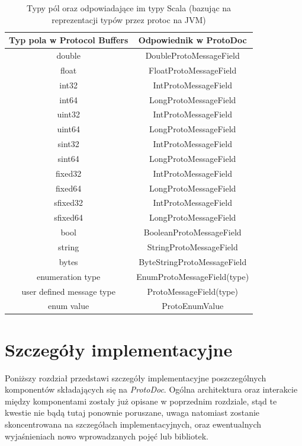 \documentclass[pdflatex,11pt]{aghdpl}
\begin{document}
\begin{table}
 \begin{center}
\begin{tabular}[c]{|c|c|}
\hline 
Typ pola w Protocol Buffers & Odpowiednik w ProtoDoc\\ \hline

double   & DoubleProtoMessageField \\ \hline
float    & FloatProtoMessageField \\ \hline
int32    & IntProtoMessageField \\ \hline
int64    & LongProtoMessageField \\ \hline 
uint32   & IntProtoMessageField \\ \hline 
uint64   & LongProtoMessageField \\ \hline 
sint32   & IntProtoMessageField \\ \hline 
sint64   & LongProtoMessageField \\ \hline 
fixed32  & IntProtoMessageField \\ \hline 
fixed64  & LongProtoMessageField \\ \hline 
sfixed32 & IntProtoMessageField \\ \hline 
sfixed64 & LongProtoMessageField \\ \hline 
bool     & BooleanProtoMessageField \\ \hline
string   & StringProtoMessageField \\ \hline 
bytes    & ByteStringProtoMessageField \\ \hline \hline 
enumeration type & EnumProtoMessageField(type) \\ \hline
user defined message type & ProtoMessageField(type) \\ \hline \hline 
enum value & ProtoEnumValue \\ \hline
 \end{tabular}
 \end{center}
\label{tab:field_types}
\caption{Typy pól oraz odpowiadające im typy Scala \small{(bazując na reprezentacji typów przez protoc na JVM)}}
\end{table}


\chapter{Szczegóły implementacyjne}
\label{sec:zastosowanePodejscie}

Poniższy rozdział przedstawi szczegóły implementacyjne poszczególnych komponentów składających się na \textit{ProtoDoc}.
Ogólna architektura oraz interakcie między komponentami zostały już opisane w poprzednim rozdziale, stąd te kwestie nie bądą tutaj ponownie poruszane,
uwaga natomiast zostanie skoncentrowana na szczegółach implementacyjnych, oraz ewentualnych wyjaśnieniach nowo wprowadzanych pojęć lub bibliotek.
\end{document}
